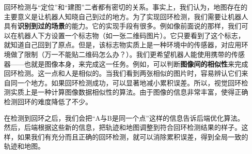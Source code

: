 回环检测与“定位”和“建图”二者都有密切的关系。事实上，我们认为，地图存在的主要意义是让机器人知晓自己到过的地方。为了实现回环检测，我们需要让机器人具有\textbf{识别到过的场景}的能力。它的实现手段有很多。例如像前面说的那样，我们可以在机器人下方设置一个标志物（如一张二维码图片）。它只要看到了这个标志，就知道自己回到了原点。但是，该标志物实质上是一种环境中的传感器，对应用环境做了限制（万一不能贴二维码怎么办？）。我们更希望机器人能使用携带的传感器——也就是图像本身，来完成这一任务。例如，可以判断\textbf{图像间的相似性}来完成回环检测。这一点和人是相似的。当我们看到两张相似的图片时，容易辨认它们来自同一个地方。如果回环检测成功，可以显著地减小累积误差。所以，视觉回环检测实质上是一种计算图像数据相似性的算法。由于图像的信息非常丰富，使得正确检测回环的难度降低了不少。

在检测到回环之后，我们会把“A与B是同一个点”这样的信息告诉后端优化算法。然后，后端根据这些新的信息，把轨迹和地图调整到符合回环检测结果的样子。这样，如果我们有充分而且正确的回环检测，就可以消除累积误差，得到全局一致的轨迹和地图。

%
%
%
%

